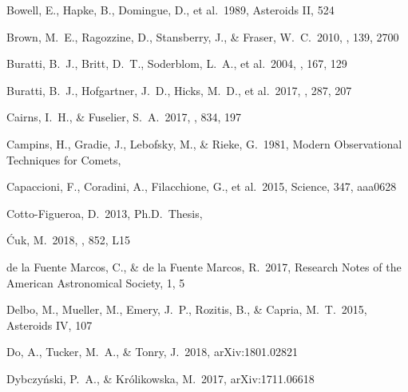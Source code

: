 \documentclass[a4paper,fleqn,usenatbib]{mnras}
\begin{document}
%


\begin{thebibliography}{99}

 Bowell, E., Hapke, B., Domingue, D., et al.\ 1989, Asteroids II, 524 

 Brown, M.~E., Ragozzine, D., Stansberry, J., \& Fraser, W.~C.\ 2010, \aj, 139, 2700 

 Buratti, B.~J., Britt, D.~T., Soderblom, L.~A., et al.\ 2004, \icarus, 167, 129 

 Buratti, B.~J., Hofgartner, J.~D., Hicks, M.~D., et al.\ 2017, \icarus, 287, 207 

 Cairns, I.~H., \& Fuselier, S.~A.\ 2017, \apj, 834, 197

 Campins, H., Gradie, J., Lebofsky, M., \& Rieke, G.\ 1981, Modern Observational Techniques for Comets,

 Capaccioni, F., Coradini, A., Filacchione, G., et al.\ 2015, Science, 347, aaa0628 

 Cotto-Figueroa, D.\ 2013, Ph.D.~Thesis,  

 {\'C}uk, M.\ 2018, \apjl, 852, L15

 de la Fuente Marcos, C., \& de la Fuente Marcos, R.\ 2017, Research Notes of the American Astronomical Society, 1, 5

 Delbo, M., Mueller, M., Emery, J.~P., Rozitis, B., \& Capria, M.~T.\ 2015, Asteroids IV, 107 

 Do, A., Tucker, M.~A., \& Tonry, J.\ 2018, arXiv:1801.02821

 Dybczy{\'n}ski, P.~A., \& Kr{\'o}likowska, M.\ 2017, arXiv:1711.06618


\end{thebibliography}
\end{document}
